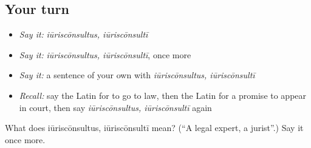 \subsection*{Your turn}
\begin{itemize}
\raggedright
  \item \emph{Say it:} \emph{iūriscōnsultus, iūriscōnsultī}
  \item \emph{Say it:} \emph{iūriscōnsultus, iūriscōnsultī}, once more
  \item \emph{Say it:} a sentence of your own with \emph{iūriscōnsultus, iūriscōnsultī}
  \item \emph{Recall:} say the Latin for to go to law, then the Latin for a promise to appear in court, then say \emph{iūriscōnsultus, iūriscōnsultī} again
\end{itemize}

\begin{tcolorbox}[breakable,colback=teal!4,colframe=teal!35!black,title={Before you move on}]
What does iūriscōnsultus, iūriscōnsultī mean? (\textquotedblleft{}A legal expert, a jurist\textquotedblright{}.) Say it once more.
\end{tcolorbox}
